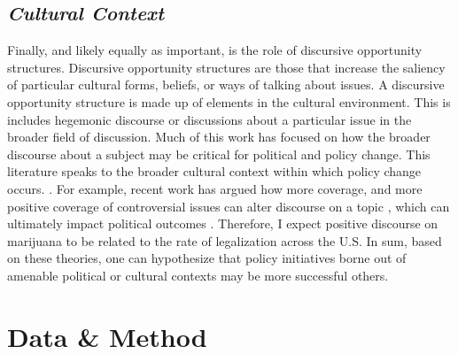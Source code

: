 




\subsection{\it{Cultural Context}}


Finally, and likely equally as important, is the role of discursive opportunity structures. Discursive opportunity structures are those that increase the saliency of particular cultural forms, beliefs, or ways of talking about issues. A discursive opportunity structure is made up of elements in the cultural environment. This is includes hegemonic discourse or discussions about a particular issue in the broader field of discussion. Much of this work has focused on how the broader discourse about a subject may be critical for political and policy change. This literature speaks to the broader cultural context within which policy change occurs. \citep{mccammon_et_al_2007,mccammon_et_al_2001}. For example, recent work has argued how more coverage, and more positive coverage of controversial issues \citep{amenta_et_al_2019,amenta_et_al_2009} can alter discourse on a topic \citep{bail_2012,ghaziani_and_baldassarri_2011}, which can ultimately impact political outcomes \citep{vasi_et_al_2015}. Therefore, I expect positive discourse on marijuana to be related to the rate of legalization across the U.S. In sum, based on these theories, one can hypothesize that policy initiatives borne out of amenable political or cultural contexts may be more successful others. 




\section{Data \& Method}

